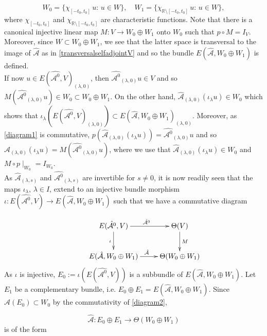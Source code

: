 \documentclass[a4paper,10pt]{article}
\begin{document}
\[W_0=\{\chi_{[-t_0,t_0]}\,u:\, u\in W\},\quad W_1=\{\chi_{\mathbb{R}\setminus[-t_0,t_0]}\,u:\, u\in W\},\]
where $\chi_{[-t_0,t_0]}$ and $\chi_{\mathbb{R}\setminus[-t_0,t_0]}$ are characteristic functions. Note that there is a canonical injective linear map $M:V\rightarrow W_0\oplus W_1$ onto $W_0$ such that $p\circ M=I_V$. Moreover, since $W\subset W_0\oplus W_1$, we see that the latter space is transversal to the image of $\hat{\mathcal{A}}$ as in \eqref{transversalselfadjointV} and so the bundle $E(\hat{\mathcal{A}},W_0\oplus W_1)$ is defined.\\
If now $u\in E(\hat{\mathcal{A}^0},V)_{(\lambda,0)}$, then $\hat{\mathcal{A}^0}_{(\lambda,0)}u\in V$ and so $M(\hat{\mathcal{A}^0}_{(\lambda,0)}u)\in W_0\subset W_0\oplus W_1$. On the other hand, $\hat{\mathcal{A}}_{(\lambda,0)}(\iota_{\lambda}u)\in W_0$ which shows that $\iota_{\lambda}(E(\hat{\mathcal{A}^0},V)_{(\lambda,0)})\subset E(\hat{\mathcal{A}},W_0\oplus W_1)_{(\lambda,0)}$. Moreover, as \eqref{diagram1} is commutative, $p(\hat{\mathcal{A}}_{(\lambda,0)}(\iota_{\lambda} u))=\hat{\mathcal{A}^0}_{(\lambda,0)}u$ and so $\hat{\mathcal{A}}_{(\lambda,0)}(\iota_{\lambda} u)=M(\hat{\mathcal{A}^0}_{(\lambda,0)}u)$, where we use that $\hat{\mathcal{A}}_{(\lambda,0)}(\iota_{\lambda}u)\in W_0$ and $M\circ p\mid_{W_0}=I_{W_0}$.\\
As $\hat{\mathcal{A}}_{(\lambda,s)}$ and $\hat{\mathcal{A}^0}_{(\lambda,s)}$ are invertible for $s\neq 0$, it is now readily seen that the maps $\iota_\lambda$, $\lambda\in I$, extend to an injective bundle morphism $\iota:E(\hat{\mathcal{A}^0},V)\rightarrow E(\hat{\mathcal{A}},W_0\oplus W_1)$ such that we have a commutative diagram 

\begin{align}\label{diagram2}
\begin{split}
\xymatrix{&E(\hat{\mathcal{A}^0},V)\ar[r]^{\hat{\mathcal{A}^0}}\ar[d]_\iota&\Theta(V)\ar[d]^{M}\\
&E(\hat{\mathcal{A}},W_0\oplus W_1)\ar[r]^{\hat{\mathcal{A}}}&\Theta(W_0\oplus W_1)}
\end{split}
\end{align}
As $\iota$ is injective, $E_0:=\iota(E(\hat{\mathcal{A}^0},V))$ is a subbundle of $E(\hat{\mathcal{A}},W_0\oplus W_1)$. Let $E_1$ be a complementary bundle, i.e. $E_0\oplus E_1=E(\hat{\mathcal{A}},W_0\oplus W_1)$. Since $\hat{\mathcal{A}}(E_0)\subset W_0$ by the commutativity of \eqref{diagram2}, 

\[\hat{\mathcal{A}}:E_0\oplus E_1\rightarrow\Theta(W_0\oplus W_1)\]
is of the form
\end{document}
